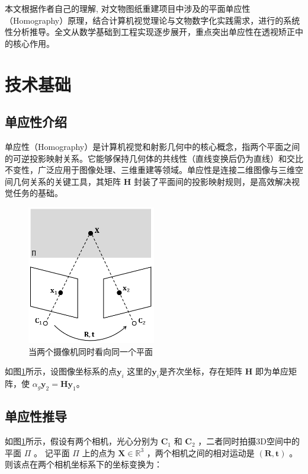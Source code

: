 \documentclass{article}
\begin{document}
本文根据作者自己的理解, 对文物图纸重建项目中涉及的平面单应性（Homography）原理，结合计算机视觉理论与文物数字化实践需求，进行的系统性分析推导。全文从数学基础到工程实现逐步展开，重点突出单应性在透视矫正中的核心作用。 

\section{技术基础}

\subsection{单应性介绍}

单应性（Homography）是计算机视觉和射影几何中的核心概念，指两个平面之间的可逆投影映射关系。它能够保持几何体的共线性（直线变换后仍为直线）和交比不变性，广泛应用于图像处理、三维重建等领域。单应性是连接二维图像与三维空间几何关系的关键工具，其矩阵 ${\mathbf{H}}$ 封装了平面间的投影映射规则，是高效解决视觉任务的基础。

\begin{figure}[h]
    \centering
    \includegraphics[width=0.5\textwidth]{./xinhaochuli/1.png}
    \caption{当两个摄像机同时看向同一个平面}
    \label{fig:1}
\end{figure}



如图\ref{fig:1}所示\cite{bradski2008learning}，设图像坐标系的点$\mathbf{y}_i$ 这里的$\mathbf{y}_i$是齐次坐标，存在矩阵 ${\mathbf{H}}$ 即为单应矩阵，使 $\alpha_g\mathbf{y}_2=\mathbf{Hy}_1$。

\subsection{单应性推导}
    

如图\ref{fig:1}所示，假设有两个相机，光心分别为 ${\mathbf{C}_1}$ 和 ${\mathbf{C}_2}$ ，二者同时拍摄3D空间中的平面 ${\Pi}$ 。
记平面 ${\Pi}$ 上的点为 ${\mathbf{X}} \in \mathbb{R}^3$ ，两个相机之间的相对运动是 $({\mathbf{R}}, {\mathbf{t}})$ 。则该点在两个相机坐标系下的坐标变换为：
\end{document}
